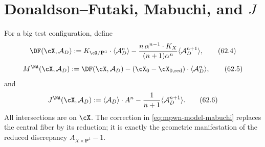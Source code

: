 \section{Donaldson--Futaki, Mabuchi, and
\texorpdfstring{$J$}{J}}
\label{sec:mpwn-k-invariants}

For a big test configuration, define
\[
 \DF(\cX,\mathcal A_D)
 :=K_{\cX/\mathbf P^1}\cdot\langle\mathcal A_D^n\rangle
   -\frac{n\,\alpha^{n-1}\cdot K_X}{(n+1)\alpha^n}
       \langle\mathcal A_D^{n+1}\rangle,
\tag{62.4}\label{eq:mpwn-df}
\]
\[
 M^{\NA}(\cX,\mathcal A_D)
 :=\DF(\cX,\mathcal A_D)
   -(\cX_0-\cX_{0,\mathrm{red}})
          \cdot\langle\mathcal A_D^n\rangle,
\tag{62.5}\label{eq:mpwn-model-mabuchi}
\]
and
\[
 J^{\NA}(\cX,\mathcal A_D)
 :=\langle\mathcal A_D\rangle\cdot A^n
      -\frac1{n+1}\langle\mathcal A_D^{n+1}\rangle.
\tag{62.6}\label{eq:mpwn-model-j}
\]
All intersections are on $\cX$.  The correction in
\eqref{eq:mpwn-model-mabuchi} replaces the central fiber by its reduction;
it is exactly the geometric manifestation of the reduced discrepancy
$A_{X\times\mathbf P^1}-1$.

